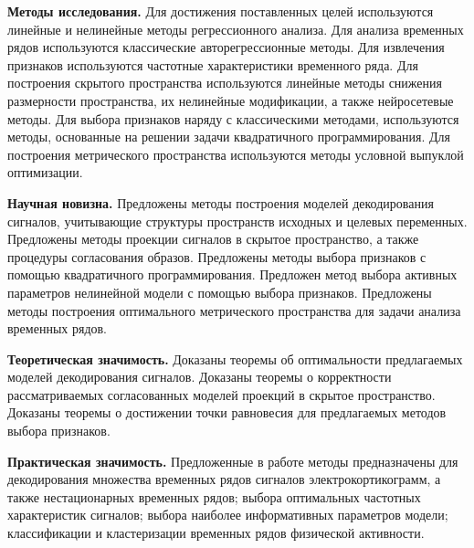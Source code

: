 \documentclass[11pt, a5paper]{dissert}
\begin{document}
\vspace{0.5cm}
\textbf{Методы исследования.}
Для достижения поставленных целей используются линейные и нелинейные методы регрессионного анализа.
Для анализа временных рядов используются классические авторегрессионные методы.
Для извлечения признаков используются частотные характеристики временного ряда.
Для построения скрытого пространства используются линейные методы снижения размерности пространства, их нелинейные модификации, а также нейросетевые методы.
Для выбора признаков наряду с классическими методами, используются методы, основанные на решении задачи квадратичного программирования.
Для построения метрического пространства используются методы условной выпуклой оптимизации.

\vspace{0.5cm}
\textbf{Научная новизна.}
Предложены методы построения моделей декодирования сигналов, учитывающие структуры пространств исходных и целевых переменных.
Предложены методы проекции сигналов в скрытое пространство, а также процедуры согласования образов.
Предложены методы выбора признаков с помощью квадратичного программирования.
Предложен метод выбора активных параметров нелинейной модели с помощью выбора признаков.
Предложены методы построения оптимального метрического пространства для задачи анализа временных рядов.

\vspace{0.5cm}
\textbf{Теоретическая значимость.}
Доказаны теоремы об оптимальности предлагаемых моделей декодирования сигналов.
Доказаны теоремы о корректности рассматриваемых согласованных моделей проекций в скрытое пространство.
Доказаны теоремы о достижении точки равновесия для предлагаемых методов выбора признаков. 

\vspace{0.5cm}
\textbf{Практическая значимость.}
Предложенные в работе методы предназначены для декодирования множества временных рядов сигналов электрокортикограмм, а также нестационарных временных рядов; выбора оптимальных частотных характеристик сигналов; выбора наиболее информативных параметров модели; классификации и кластеризации временных рядов физической активности.
\end{document}

